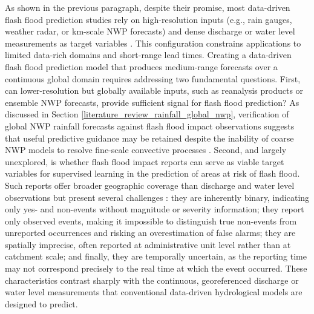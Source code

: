 As  shown in the previous paragraph, despite their promise, most data-driven flash flood prediction studies rely on high-resolution inputs (e.g., rain gauges, weather radar, or km-scale NWP forecasts) and dense discharge or water level measurements as target variables \citep{Santos_2025}. This configuration constrains applications to limited data-rich domains and short-range lead times. Creating a data-driven flash flood prediction model that produces medium-range forecasts over a continuous global domain requires addressing two fundamental questions. First, can lower-resolution but globally available inputs, such as reanalysis products or ensemble NWP forecasts, provide sufficient signal for flash flood prediction? As discussed in Section \ref{literature_review_rainfall_global_nwp}, verification of global NWP rainfall forecasts against flash flood impact observations suggests that useful predictive guidance may be retained despite the inability of coarse NWP models to resolve fine-scale convective processes \citep{Pillosu_2024}. Second, and largely unexplored, is whether flash flood impact reports can serve as viable target variables for supervised learning in the prediction of areas at risk of flash flood. Such reports offer broader geographic coverage than discharge and water level observations but present several challenges \citep{Panwar_2020, Marsigli_2021, Pillosu_2024}: they are inherently binary, indicating only yes- and non-events without magnitude or severity information; they report only observed events, making it impossible to distinguish true non-events from unreported occurrences and risking an overestimation of false alarms; they are spatially imprecise, often reported at administrative unit level rather than at catchment scale; and finally, they are temporally uncertain, as the reporting time may not correspond precisely to the real time at which the event occurred. These characteristics contrast sharply with the continuous, georeferenced discharge or water level measurements that conventional data-driven hydrological models are designed to predict.

